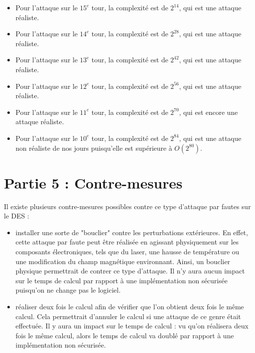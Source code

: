\documentclass[11pt]{article}
\begin{document}
\begin{itemize}
	\item Pour l'attaque sur le $15^e$ tour, la complexité est de $2^{14}$, qui est une attaque réaliste. 
	\item Pour l'attaque sur le $14^e$ tour, la complexité est de $2^{28}$, qui est une attaque réaliste. 
	\item Pour l'attaque sur le $13^e$ tour, la complexité est de $2^{42}$, qui est une attaque réaliste. 
	\item Pour l'attaque sur le $12^e$ tour, la complexité est de $2^{56}$, qui est une attaque réaliste. 
	\item Pour l'attaque sur le $11^e$ tour, la complexité est de $2^{70}$, qui est encore une attaque réaliste. 
	\item Pour l'attaque sur le $10^e$ tour, la complexité est de $2^{84}$, qui est une attaque non réaliste de nos jours puisqu'elle est supérieure à $O(2^{80})$. 
	
\end{itemize}

\section{Partie 5 : Contre-mesures}

Il existe plusieurs contre-mesures possibles contre ce type d'attaque par fautes sur le DES : 
\begin{itemize}
	\item installer une sorte de "bouclier" contre les perturbations extérieures. En effet, cette attaque par faute peut être réalisée en agissant physiquement sur les composants électroniques, tels que du laser, une hausse de température ou une modification du champ magnétique environnant. Ainsi, un bouclier physique permettrait de contrer ce type d'attaque. Il n'y aura aucun impact sur le temps de calcul par rapport à une implémentation non sécurisée puisqu'on ne change pas le logiciel. \newline
	
	\item réaliser deux fois le calcul afin de vérifier que l'on obtient deux fois le même calcul. Cela permettrait d'annuler le calcul si une attaque de ce genre était effectuée. Il y aura un impact sur le temps de calcul : vu qu'on réalisera deux fois le même calcul, alors le temps de calcul va doublé par rapport à une implémentation non sécurisée. 
\end{itemize}
\end{document}
